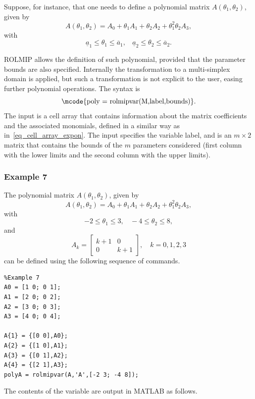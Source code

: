 \documentclass[english,11pt]{article}
\theoremstyle{break} \theorembodyfont{\small\rm}
\begin{document}
Suppose, for instance, that one needs to define a polynomial matrix $A(\theta_1,\theta_2)$, given by
\[
 A(\theta_1,\theta_2) = A_0 + \theta_1A_1 + \theta_2A_2 + \theta_1^2\theta_2A_3,
\]
with
\[
 \underline{a}_1 \leq \theta_1 \leq \overline{a}_1, ~~~  ~ \underline{a}_2 \leq \theta_2 \leq \overline{a}_2.
\]

ROLMIP allows the definition of such polynomial, provided that the parameter bounds are also
specified. Internally the transformation to a multi-simplex domain is applied, but such a transformation
is not explicit to the user, easing further polynomial operations. The syntax is
\[
\mbox{\mcode{poly = rolmipvar(M,label,bounds)}}.
\]
The input  is a cell array that contains information about the matrix coefficients and
the associated monomials, defined in a similar way as in~\eqref{eq_cell_array_expon}. The input
 specifies the variable label, and  is an $m \times 2$ matrix that contains
the bounds of the $m$ parameters considered (first column with the lower limits and the second column with the upper limits).

\subsubsection*{Example 7}
The polynomial matrix $A(\theta_1,\theta_2)$, given by
\[
A(\theta_1,\theta_2) = A_0 + \theta_1A_1 + \theta_2A_2 + \theta_1^2\theta_2A_3,
\]
with
\[
 -2 \leq \theta_1 \leq 3, ~~~  ~ -4 \leq \theta_2 \leq 8,
\]
and
\[
 A_k = \begin{bmatrix} k+1 & 0 \\ 0 & k+1 \end{bmatrix}, \quad k = 0, 1, 2, 3
\]
can be defined using the following sequence of commands.

\vspace{0.5cm}%
\begin{minipage}{9.0cm}
\begin{lstlisting}
%Example 7
A0 = [1 0; 0 1];
A1 = [2 0; 0 2];
A2 = [3 0; 0 3];
A3 = [4 0; 0 4];

A{1} = {[0 0],A0};
A{2} = {[1 0],A1};
A{3} = {[0 1],A2};
A{4} = {[2 1],A3};
polyA = rolmipvar(A,'A',[-2 3; -4 8]);
\end{lstlisting}
\end{minipage}
\vspace{0.2cm}

The contents of the variable  are output in MATLAB as follows.
\end{document}
